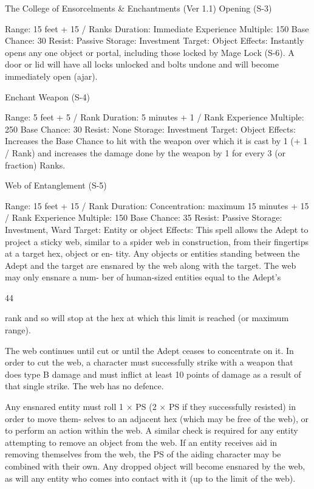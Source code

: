 \begin{Chapter}{The College of Ensorcelments \& Enchantments (Ver 1.1)}
Opening (S-3) 

Range: 15 feet + 15 / Ranks 
Duration: Immediate 
Experience Multiple: 150 
Base Chance: 30%
Resist: Passive 
Storage: Investment 
Target: Object 
Effects:  Instantly  opens  any  one  object  or  portal, 
including  those  locked  by  Mage  Lock  (S-6).  A 
door  or  lid  will  have  all  locks  unlocked  and  bolts 
undone and will become immediately open (ajar). 

Enchant Weapon (S-4) 

Range: 5 feet + 5 / Rank 
Duration: 5 minutes + 1 / Rank 
Experience Multiple: 250 
Base Chance: 30%
Resist: None 
Storage: Investment 
Target: Object 
Effects:  Increases  the  Base  Chance  to  hit  with  the 
weapon over which it is cast by 1 (+ 1 / Rank) and 
increases the damage done by the weapon by 1 for 
every 3 (or fraction) Ranks. 

Web of Entanglement (S-5) 

Range: 15 feet + 15 / Rank 
Duration:  Concentration:  maximum  15  minutes  + 
15 / Rank 
Experience Multiple: 150 
Base Chance: 35%
Resist: Passive 
Storage: Investment, Ward 
Target: Entity or object 
Effects:  This  spell  allows  the  Adept  to  project  a 
sticky web, similar to a spider web in construction, 
from  their  fingertips  at  a  target  hex,  object  or  en-
tity.  Any  objects  or  entities  standing  between  the 
Adept and the target are ensnared by the web along 
with the target. The web may only ensnare a num-
ber  of  human-sized  entities  equal  to  the  Adept’s 

44 

rank and so will stop at the hex at which this limit 
is reached (or maximum range). 

The  web  continues  until  cut  or  until  the  Adept 
ceases to concentrate on it. In order to cut the web, 
a character must successfully strike with a weapon 
that does type B damage and must inflict at least 10 
points  of  damage  as  a  result  of  that  single  strike. 
The web has no defence. 

Any  ensnared  entity  must  roll  1  ×  PS  (2  ×  PS  if 
they  successfully  resisted)  in  order  to  move  them-
selves to an adjacent hex (which may be free of the 
web),  or  to  perform  an  action  within  the  web.  A 
similar  check  is  required  for  any  entity  attempting 
to  remove  an  object  from  the  web.  If  an  entity 
receives aid in removing themselves from the web, 
the  PS  of  the  aiding  character  may  be  combined 
with  their  own.  Any  dropped  object  will  become 
ensnared by the web, as will any entity who comes 
into contact with it (up to the limit of the web). 


\end{Chapter}
